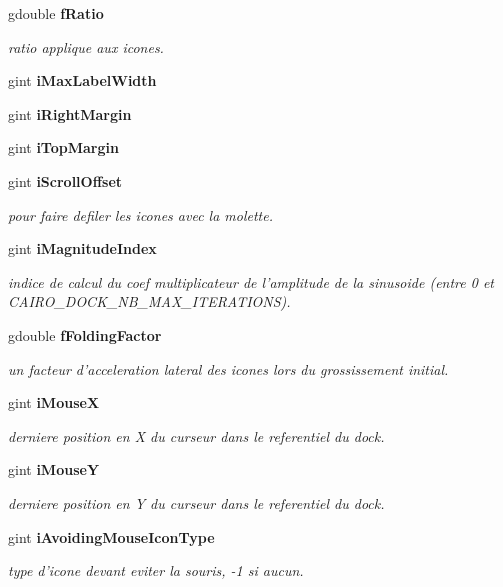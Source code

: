 \begin{CompactItemize}
gdouble {\bf fRatio}
\begin{CompactList}\small\item\em ratio applique aux icones. \item\end{CompactList}\item 
gint {\bf iMaxLabelWidth}
\item 
gint {\bf iRightMargin}
\item 
gint {\bf iTopMargin}
\item 
gint {\bf iScrollOffset}
\begin{CompactList}\small\item\em pour faire defiler les icones avec la molette. \item\end{CompactList}\item 
gint {\bf iMagnitudeIndex}
\begin{CompactList}\small\item\em indice de calcul du coef multiplicateur de l'amplitude de la sinusoide (entre 0 et CAIRO\_\-DOCK\_\-NB\_\-MAX\_\-ITERATIONS). \item\end{CompactList}\item 
gdouble {\bf fFoldingFactor}
\begin{CompactList}\small\item\em un facteur d'acceleration lateral des icones lors du grossissement initial. \item\end{CompactList}\item 
gint {\bf iMouseX}
\begin{CompactList}\small\item\em derniere position en X du curseur dans le referentiel du dock. \item\end{CompactList}\item 
gint {\bf iMouseY}
\begin{CompactList}\small\item\em derniere position en Y du curseur dans le referentiel du dock. \item\end{CompactList}\item 
gint {\bf iAvoidingMouseIconType}
\begin{CompactList}\small\item\em type d'icone devant eviter la souris, -1 si aucun. \item\end{CompactList}\item 

\end{CompactItemize}

